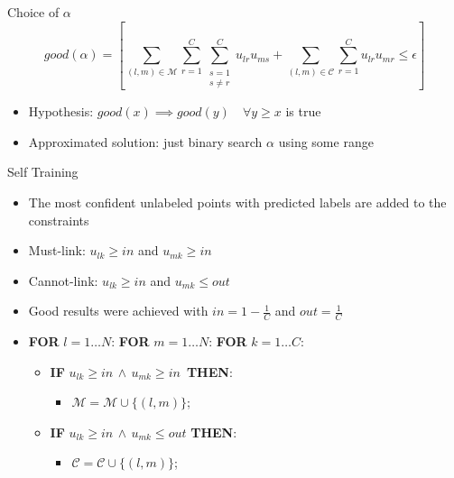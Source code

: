 \documentclass{beamer}
\begin{document}
\begin{frame}{Choice of $\alpha$}
\begin{displaymath}
\label{restriction-equation}
good(\alpha)=
\left[
\sum_{(l,m)\in\mathcal{M}}\sum_{r=1}^{C}\sum_{\substack{s=1\\{s}\neq{r}}}^{C}u_{lr}u_{ms}+\sum_{(l,m)\in\mathcal{C}}\sum_{r=1}^{C}u_{lr}u_{mr}
\leq \epsilon
\right]
\end{displaymath}
\begin{itemize}
\item{Hypothesis: $good(x) \implies good(y) \quad \forall y \geq x$ is true}
\pause
\item{Approximated solution: just binary search $\alpha$ using some range}
\end{itemize}
\end{frame}

\begin{frame}{Self Training}
	\begin{itemize}
		\item{The most confident unlabeled points with predicted labels are added to the constraints}
		\item{Must-link: $u_{lk} \geq in$ and $u_{mk} \geq in$}
		\item{Cannot-link: $u_{lk} \geq in$ and $u_{mk} \leq out$}
		\item{Good results were achieved with $in = 1 - \frac{1}{C}$ and $out = \frac{1}{C}$}
	\end{itemize}
	\begin{itemize}
		\item[]\textbf{FOR} $l = 1 \ldots N$: \textbf{FOR} $m = 1 \ldots N$: \textbf{FOR} $k = 1 \ldots C$:
	\begin{itemize}
		\item[]\textbf{IF} $u_{lk} \geq in \, \land \, u_{mk} \geq in \,$ \textbf{THEN}:
			\begin{itemize}	
				\item[]$\mathcal{M} = \mathcal{M} \cup\{(l,m)\}$;
			\end{itemize}	
		\item[]\textbf{IF} $u_{lk} \geq in \, \land \, u_{mk} \leq out$ \textbf{THEN}: 
			\begin{itemize}	
				\item[]$\mathcal{C} = \mathcal{C} \cup\{(l,m)\}$;
			\end{itemize}
		\end{itemize}
	\end{itemize}
\end{frame}
\end{document}
